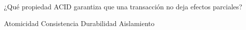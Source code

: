 \question[1] ¿Qué propiedad ACID garantiza que una transacción no deja efectos parciales?
\begin{choices}
\CorrectChoice Atomicidad
\choice Consistencia
\choice Durabilidad
\choice Aislamiento
\end{choices}